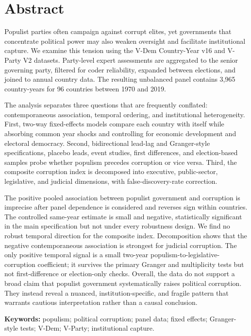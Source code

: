 \chapter*{Abstract}

Populist parties often campaign against corrupt elites, yet governments that concentrate political
power may also weaken oversight and facilitate institutional capture. We examine this tension using
the V-Dem Country-Year v16 and V-Party V2 datasets. Party-level expert assessments are aggregated to
the senior governing party, filtered for coder reliability, expanded between elections, and joined to
annual country data. The resulting unbalanced panel contains 3,965 country-years for 96 countries
between 1970 and 2019.

The analysis separates three questions that are frequently conflated: contemporaneous association,
temporal ordering, and institutional heterogeneity. First, two-way fixed-effects models compare each
country with itself while absorbing common year shocks and controlling for economic development and
electoral democracy. Second, bidirectional lead-lag and Granger-style specifications, placebo leads,
event studies, first differences, and election-based samples probe whether populism precedes
corruption or vice versa. Third, the composite corruption index is decomposed into executive,
public-sector, legislative, and judicial dimensions, with false-discovery-rate correction.

The positive pooled association between populist government and corruption is imprecise after panel
dependence is considered and reverses sign within countries. The controlled same-year estimate is
small and negative, statistically significant in the main specification but not under every
robustness design. We find no robust temporal direction for the composite index. Decomposition shows
that the negative contemporaneous association is strongest for judicial corruption. The only positive
temporal signal is a small two-year populism-to-legislative-corruption coefficient; it survives the
primary Granger and multiplicity tests but not first-difference or election-only checks. Overall, the
data do not support a broad claim that populist government systematically raises political corruption.
They instead reveal a nuanced, institution-specific, and fragile pattern that warrants cautious
interpretation rather than a causal conclusion.

\textbf{Keywords:} populism; political corruption; panel data; fixed effects; Granger-style tests;
V-Dem; V-Party; institutional capture.
\clearpage
